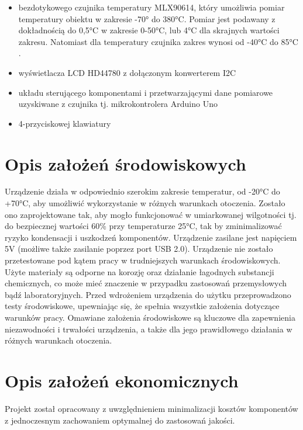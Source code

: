     \begin{itemize}

        \item bezdotykowego czujnika temperatury MLX90614, który umożliwia pomiar temperatury obiektu w zakresie -70° do 380°C. Pomiar jest podawany z dokładnością do 0,5°C w zakresie 0-50°C, lub 4°C dla skrajnych wartości zakresu. Natomiast dla temperatury czujnika zakres wynosi od -40°C do 85°C \cite{3}.
        \item wyświetlacza LCD HD44780 z dołączonym konwerterem I2C
        \item układu sterującego komponentami i przetwarzającymi dane pomiarowe uzyskiwane z czujnika tj. mikrokontrolera Arduino Uno
        \item 4-przyciskowej klawiatury 

    \end{itemize}

    \section{Opis założeń środowiskowych}
    
Urządzenie działa w odpowiednio szerokim zakresie temperatur, od -20°C do +70°C, aby umożliwić wykorzystanie w różnych warunkach otoczenia. Zostało ono zaprojektowane tak, aby mogło funkcjonować w umiarkowanej wilgotności tj. do bezpiecznej wartości 60\% przy temperaturze 25°C, tak by zminimalizować ryzyko kondensacji i uszkodzeń komponentów. Urządzenie zasilane jest napięciem 5V (możliwe także zasilanie poprzez port USB 2.0). Urządzenie nie zostało przetestowane pod kątem pracy w trudniejszych warunkach środowiskowych. Użyte materiały są odporne na korozję oraz działanie łagodnych substancji chemicznych, co może mieć znaczenie w przypadku zastosowań przemysłowych bądź laboratoryjnych. Przed wdrożeniem urządzenia do użytku przeprowadzono testy środowiskowe, upewniając się, że spełnia wszystkie założenia dotyczące warunków pracy. Omawiane założenia środowiskowe są kluczowe dla zapewnienia niezawodności i trwałości urządzenia, a także dla jego prawidłowego działania w różnych warunkach otoczenia.

\section{Opis założeń ekonomicznych}
Projekt został opracowany z uwzględnieniem minimalizacji kosztów komponentów z jednoczesnym zachowaniem optymalnej do zastosowań jakości.

